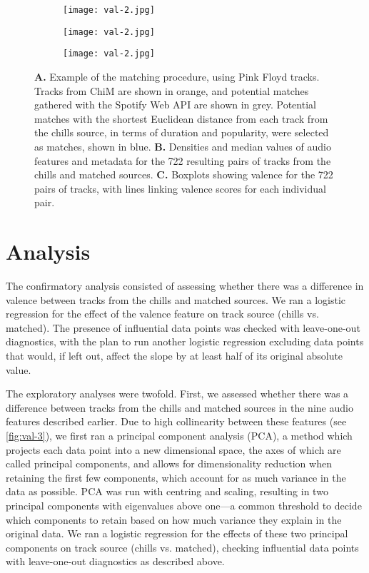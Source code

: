 \begin{figure}[t!]
\centering
\begin{subfigure}[t]{\textwidth}
    \texttt{[image: val-2.jpg]}
\end{subfigure}
\begin{subfigure}[t]{0\textwidth}
    \texttt{[image: val-2.jpg]}
\end{subfigure}
\begin{subfigure}[t]{0\textwidth}
    \texttt{[image: val-2.jpg]}
\end{subfigure}
\caption{\textbf{A.} Example of the matching procedure, using Pink Floyd tracks. Tracks from ChiM are shown in orange, and potential matches gathered with the Spotify Web API are shown in grey. Potential matches with the shortest Euclidean distance from each track from the chills source, in terms of duration and popularity, were selected as matches, shown in blue. \textbf{B.} Densities and median values of audio features and metadata for the 722 resulting pairs of tracks from the chills and matched sources. \textbf{C.} Boxplots showing valence for the 722 pairs of tracks, with lines linking valence scores for each individual pair.}
\label{fig:val-2}
\end{figure}

\section{Analysis}
\label{se:val-methods-3}

The confirmatory analysis consisted of assessing whether there was a difference in valence between tracks from the chills and matched sources. We ran a logistic regression for the effect of the valence feature on track source (chills vs. matched). The presence of influential data points was checked with leave-one-out diagnostics, with the plan to run another logistic regression excluding data points that would, if left out, affect the slope by at least half of its original absolute value.

The exploratory analyses were twofold. First, we assessed whether there was a difference between 
tracks from the chills and matched sources in the nine audio features described earlier. Due to high collinearity between these features (see \autoref{fig:val-3}), we first ran a principal component analysis (PCA), a method which projects each data point into a new dimensional space, the axes of which are called principal components, and allows for dimensionality reduction when retaining the first few components, which account for as much variance in the data as possible. PCA was run with centring and scaling, resulting in two principal components with eigenvalues above one---a common threshold to decide which components to retain based on how much variance they explain in the original data. We ran a logistic regression for the effects of these two principal components on track source (chills vs. matched), checking influential data points with leave-one-out diagnostics as described above.

